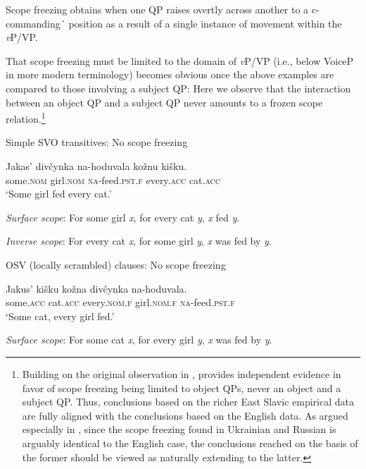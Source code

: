 \documentclass[output=paper,colorlinks,citecolor=brown]{langscibook}
\begin{document}
Scope freezing obtains when one QP raises overtly across another to a \mbox{c-commanding}´ position as a result of a single instance of movement within the \textit{v}P/VP.
    \z

\noindent That scope freezing must be limited to the domain of \textit{v}P/VP (i.e., below VoiceP in more modern terminology) becomes obvious once the above examples are compared to those involving a subject QP: Here we observe that the interaction between an object QP and a subject QP never amounts to a frozen scope relation.\footnote{Building on the original observation in \citet{Larson1990}, \citet{Bruening2001} provides independent evidence in favor of scope freezing being limited to object QPs, never an object and a subject QP. Thus, conclusions based on the richer East Slavic empirical data are fully aligned with the conclusions based on the English data. As argued especially in \citet{AntonyukUnderReview}, since the scope freezing found in Ukrainian and Russian is arguably identical to the English case, the conclusions reached on the basis of the former should be viewed as naturally extending to the latter.}

\ea%
    \label{ex:antonyuk:12}
Simple SVO transitives: No scope freezing

\gll          Jakas’   divčynka   na-hoduvala     kožnu kišku.    \\
  some.\textsc{nom}   girl.\textsc{nom} \textsc{na}-feed.\textsc{pst.f}   every.\textsc{acc} cat.\textsc{acc}\\
\glt `Some girl fed every cat.’

\textit{Surface scope}: For some girl \textit{x}, for every cat \textit{y}, \textit{x} fed \textit{y}.

\textit{Inverse scope}: For every cat \textit{x}, for some girl \textit{y}, \textit{x} was fed by \textit{y}.
\z




\ea%
\label{ex:antonyuk:13}
OSV (locally scrambled) clauses: No scope freezing

\gll           Jakus’ kišku     kožna divčynka   na-hoduvala.  \\
  some.\textsc{acc} cat.\textsc{acc}     every.\textsc{nom.f} girl.\textsc{nom.f}  \textsc{na}-feed.\textsc{pst.f}\\
\glt `Some cat, every girl fed.’

\textit{Surface scope}: For some cat \textit{x}, for every girl \textit{y}, \textit{x} was fed by \textit{y}.
\end{document}
